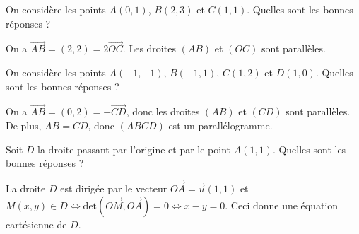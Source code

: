 \begin{question}
On considère les points $A(0,1)$, $B(2,3)$ et $C(1,1)$. Quelles sont les bonnes réponses ?
\begin{answers}  
\end{answers}
\begin{explanations}
On a $\overrightarrow{AB}=(2,2)=2\overrightarrow{OC}$. Les droites $(AB)$ et $(OC)$ sont parallèles.
\end{explanations}
\end{question}


\begin{question}
On considère les points $A(-1,-1)$, $B(-1,1)$, $C(1,2)$ et $D(1,0)$. Quelles sont les bonnes réponses ?
\begin{answers}  
\end{answers}
\begin{explanations}
On a $\overrightarrow{AB}=(0,2)=-\overrightarrow{CD}$, donc les droites $(AB)$ et $(CD)$ sont parallèles. De plus, $AB=CD$, donc $(ABCD)$ est un parallélogramme.
\end{explanations}
\end{question}


\begin{question}
Soit $D$ la droite passant par l'origine et par le point $A(1,1)$. Quelles sont les bonnes réponses ?
\begin{answers}  
\end{answers}
\begin{explanations}
La droite $D$ est dirigée par le vecteur $\overrightarrow{OA}=\vec{u}(1,1)$ et $M(x,y)\in D \Leftrightarrow \mbox{det}(\overrightarrow{OM},\overrightarrow{OA})=0\Leftrightarrow x-y=0$. Ceci donne une équation cartésienne de $D$.
\end{explanations}
\end{question}


